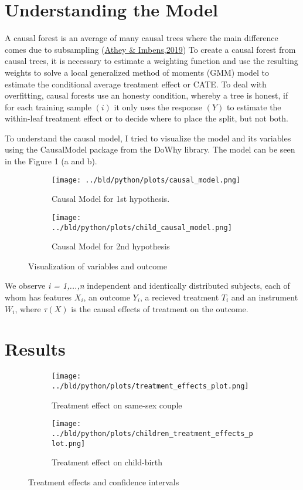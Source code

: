 \documentclass[11pt, a4paper, leqno]{article}
\begin{document}
 \section{Understanding the Model} %
\label{sec:Understanding the Model}

A causal forest is an average of many causal trees where the main difference comes due to subsampling
(\href{https://www.annualreviews.org/doi/abs/10.1146/annurev-economics-080217-053433}{Athey \& Imbens,2019})
To create a causal forest from
causal trees, it is necessary to estimate a weighting function and use the resulting weights to solve a local generalized method of moments (GMM)
model to estimate the conditional average treatment effect or CATE. To deal with overfitting, causal forests use an honesty condition, whereby a
tree is honest, if for each training sample $(i)$ it only uses the response $(Y)$ to estimate the within-leaf treatment effect or to decide where
to place the split, but not both.

To understand the causal model, I tried to visualize the model and its variables using the CausalModel package from the DoWhy library.
The model
can be seen in the Figure 1 (a and b).

\begin{figure}[!tbp]
  \begin{subfigure}[b]{0.5\textwidth}
    \texttt{[image: ../bld/python/plots/causal\_model.png]}
    \caption{Causal Model for 1st hypothesis.}
    \label{fig:f1}
  \end{subfigure}
  \hfill
  \begin{subfigure}[b]{0.5\textwidth}
    \texttt{[image: ../bld/python/plots/child\_causal\_model.png]}
    \caption{Causal Model for 2nd hypothesis}
    \label{fig:f2}
  \end{subfigure}
  \caption{Visualization of variables and outcome}
\end{figure}

We observe \textit{i = 1,...,n} independent and identically distributed subjects, each of whom has features $X_i$, an outcome $Y_i$, a recieved
treatment $T_i$ and an instrument $W_i$, where $\tau(X)$ is the causal effects of treatment on the outcome.


 \section{Results} %
\label{sec:Results}

\begin{figure}[!tbp]
  \begin{subfigure}[c]{0.5\textwidth}
    \texttt{[image: ../bld/python/plots/treatment\_effects\_plot.png]}
    \caption{Treatment effect on same-sex couple}
    \label{fig:f3}
  \end{subfigure}
  \hfill
  \begin{subfigure}[c]{0.5\textwidth}
    \texttt{[image: ../bld/python/plots/children\_treatment\_effects\_plot.png]}
    \caption{Treatment effect on child-birth}
    \label{fig:f4}
  \end{subfigure}
  \caption{Treatment effects and confidence intervals}
\end{figure}
\end{document}
